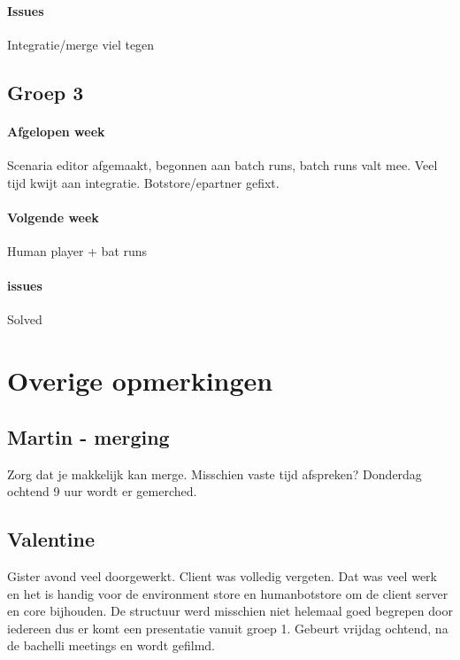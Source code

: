\documentclass{article}
\begin{document}
\paragraph*{Issues}
Integratie/merge viel tegen

\subsection*{Groep 3}
\paragraph*{Afgelopen week} Scenaria editor afgemaakt, begonnen aan batch runs, batch runs valt mee. Veel tijd kwijt aan integratie. Botstore/epartner gefixt. 

\paragraph*{Volgende week}
Human player + bat runs

\paragraph*{issues}
Solved

\section*{Overige opmerkingen}
\subsection*{Martin - merging} 
Zorg dat je makkelijk kan merge. Misschien vaste tijd afspreken? Donderdag ochtend 9 uur wordt er gemerched. 

\subsection*{Valentine}
Gister avond veel doorgewerkt. Client was volledig vergeten. Dat was veel werk en het is handig voor de environment store en humanbotstore om de client server en core bijhouden. De structuur werd misschien niet helemaal goed begrepen door iedereen dus er komt een presentatie vanuit groep 1. Gebeurt vrijdag ochtend, na de bachelli meetings en wordt gefilmd.
\end{document}

